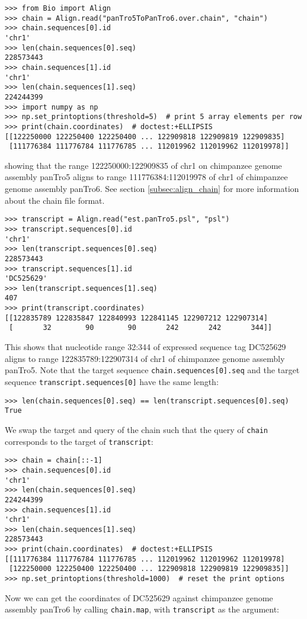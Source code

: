 \begin{verbatim}
>>> from Bio import Align
>>> chain = Align.read("panTro5ToPanTro6.over.chain", "chain")
>>> chain.sequences[0].id
'chr1'
>>> len(chain.sequences[0].seq)
228573443
>>> chain.sequences[1].id
'chr1'
>>> len(chain.sequences[1].seq)
224244399
>>> import numpy as np
>>> np.set_printoptions(threshold=5)  # print 5 array elements per row
>>> print(chain.coordinates)  # doctest:+ELLIPSIS
[[122250000 122250400 122250400 ... 122909818 122909819 122909835]
 [111776384 111776784 111776785 ... 112019962 112019962 112019978]]
\end{verbatim}
showing that the range 122250000:122909835 of chr1 on chimpanzee genome assembly panTro5 aligns to range 111776384:112019978 of chr1 of chimpanzee genome assembly panTro6. See section \ref{subsec:align_chain} for more information about the chain file format.
\begin{verbatim}
>>> transcript = Align.read("est.panTro5.psl", "psl")
>>> transcript.sequences[0].id
'chr1'
>>> len(transcript.sequences[0].seq)
228573443
>>> transcript.sequences[1].id
'DC525629'
>>> len(transcript.sequences[1].seq)
407
>>> print(transcript.coordinates)
[[122835789 122835847 122840993 122841145 122907212 122907314]
 [       32        90        90       242       242       344]]
\end{verbatim}
This shows that nucleotide range 32:344 of expressed sequence tag DC525629
aligns to range 122835789:122907314 of chr1 of chimpanzee genome assembly
panTro5.  Note that the target sequence \verb|chain.sequences[0].seq| and the target sequence \verb|transcript.sequences[0]| have the same length:
\begin{verbatim}
>>> len(chain.sequences[0].seq) == len(transcript.sequences[0].seq)
True
\end{verbatim}
We swap the target and query of the chain such that the query of \verb|chain| corresponds to the target of \verb|transcript|:
\begin{verbatim}
>>> chain = chain[::-1]
>>> chain.sequences[0].id
'chr1'
>>> len(chain.sequences[0].seq)
224244399
>>> chain.sequences[1].id
'chr1'
>>> len(chain.sequences[1].seq)
228573443
>>> print(chain.coordinates)  # doctest:+ELLIPSIS
[[111776384 111776784 111776785 ... 112019962 112019962 112019978]
 [122250000 122250400 122250400 ... 122909818 122909819 122909835]]
>>> np.set_printoptions(threshold=1000)  # reset the print options
\end{verbatim}
Now we can get the coordinates of DC525629 against chimpanzee genome assembly panTro6 by calling \verb|chain.map|, with \verb|transcript| as the argument:
